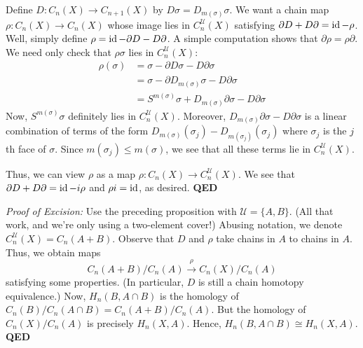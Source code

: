 \documentclass{article}
\begin{document}
Define $D: C_n(X) \to C_{n+1}(X)$ by $D\sigma = D_{m(\sigma)}\sigma$. We want a chain map $\rho: C_n(X) \to C_n(X)$ whose image lies in $C_n^\mathcal{U}(X)$ satisfying $\partial D + D \partial = \operatorname{id} - \rho$. Well, simply define $\rho = \operatorname{id} - \partial D - D \partial$. A simple computation shows that $\partial \rho = \rho \partial$. We need only check that $\rho\sigma$ lies in $C_n^\mathcal{U}(X)$:%
\noindent\noindent\[%
\begin{aligned}
\rho(\sigma) &= \sigma - \partial D \sigma - D \partial \sigma \\
&= \sigma - \partial D_{m(\sigma)} \sigma - D \partial \sigma \\
&= S^{m(\sigma)} \sigma  + D_{m(\sigma)} \partial \sigma - D \partial \sigma
\end{aligned}
\]%
\noindent{}Now, $S^{m(\sigma)} \sigma$ definitely lies in $C_n^\mathcal{U}(X)$. Moreover, $D_{m(\sigma)} \partial \sigma - D \partial \sigma$ is a linear combination of terms of the form $D_{m(\sigma)} (\sigma_j) - D_{m(\sigma_j)} (\sigma_j)$ where $\sigma_j$ is the $j$th face of $\sigma$. Since $m(\sigma_j) \le m(\sigma)$, we see that all these terms lie in $C_n^\mathcal{U}(X)$.

Thus, we can view $\rho$ as a map $\rho: C_n(X) \to C_n^\mathcal{U}(X)$. We see that $\partial D + D \partial = \operatorname{id} - i\rho$ and $\rho i = \operatorname{id}$, as desired. \textbf{QED}%

\emph{Proof of Excision:} Use the preceding proposition with $\mathcal{U} = \{A, B\}$. (All that work, and we're only using a two-element cover!) Abusing notation, we denote $C_n^\mathcal{U}(X) = C_n(A+B)$. Observe that $D$ and $\rho$ take chains in $A$ to chains in $A$. Thus, we obtain maps%
\noindent\noindent\[%
C_n(A+B) / C_n(A) \overset{\rho}{\longrightarrow} C_n(X) / C_n(A)
\]%
\noindent{}satisfying some properties. (In particular, $D$ is still a chain homotopy equivalence.) Now, $H_n(B, A \cap B)$ is the homology of $C_n(B) / C_n(A \cap B) = C_n(A+B) / C_n(A)$. But the homology of $C_n(X) / C_n(A)$ is precisely $H_n(X, A)$. Hence, $H_n(B, A \cap B) \cong H_n(X, A)$. \textbf{QED}%
\end{document}
